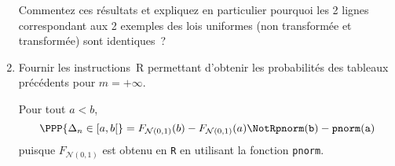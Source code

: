 \documentclass[10pt]{report}
\begin{document}
\begin{exercice}
\begin{enumerate}
Commentez ces résultats et expliquez en particulier pourquoi les 2 lignes correspondant aux 2 exemples des lois uniformes (non transformée et transformée) sont identiques~?
\item Fournir les instructions~R permettant d'obtenir les probabilités des tableaux précédents pour $m=+\infty$.\\
\begin{Correction} Pour tout $a<b$,
$$\PPP{\Delta_n \in [a,b[}=F_{\mathcal{N}(0,1)}(b)-F_{\mathcal{N}(0,1)}(a)\NotR\mathtt{pnorm(b)-pnorm(a)}$$
puisque $F_{\mathcal{N}(0,1)}$ est obtenu en \texttt{R} en utilisant la fonction \texttt{pnorm}.
\end{Correction}
\end{enumerate}
\end{exercice}
\end{document}
